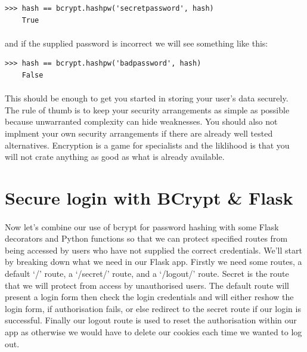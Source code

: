 \documentclass[12pt, a4paper, twoside]{book}
\begin{document}
\begin{lstlisting}[style=DOS]
    >>> hash == bcrypt.hashpw('secretpassword', hash)
    True
\end{lstlisting}

\paragraph{} and if the supplied password is incorrect we will see something like this:

\begin{lstlisting}[style=DOS]
    >>> hash == bcrypt.hashpw('badpassword', hash)
    False
\end{lstlisting}

\paragraph{} This should be enough to get you started in storing your user's data securely. The rule of thumb is to keep your security arrangements as simple as possible because unwarranted complexity can hide weaknesses. You should also not implment your own security arrangements if there are already well tested alternatives. Encryption is a game for specialists and the liklihood is that you will not crate anything as good as what is already available.


\section{Secure login with BCrypt \& Flask}
\label{login}
\paragraph{} Now let's combine our use of bcrypt for password hashing with some Flask decorators and Python functions so that we can protect specified routes from being accessed by users who have not supplied the correct credentials. We'll start by breaking down what we need in our Flask app. Firstly we need some routes, a default `/' route, a `/secret/' route, and a `/logout/' route. Secret is the route that we will protect from access by unauthorised users. The default route will present a login form then check the login credentials and will either reshow the login form, if authorisation fails, or else redirect to the secret route if our login is successful. Finally our logout route is used to reset the authorisation within our app as otherwise we would have to delete our cookies each time we wanted to log out.
\end{document}
